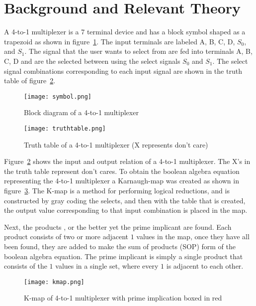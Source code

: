 \documentclass[conference]{IEEEtran}
\begin{document}
\section{Background and Relevant Theory}
\label{sec:Background}

A 4-to-1 multiplexer is a 7 terminal device and has a block symbol shaped as a trapezoid as shown in figure~\ref{fig:blockdiagram}. The input terminals are labeled A, B, C, D, $S_0$, and $S_1$. The signal that the user wants to select from are fed into terminals A, B, C, D and are the selected between using the select signals $S_0$ and $S_1$. The select signal combinations corresponding to each input signal are shown in the truth table of figure~\ref{fig:truthtable}.
       \begin{figure}[H]
       \center
          \texttt{[image: symbol.png]}
          \caption{Block diagram of a 4-to-1 multiplexer}
          \label{fig:blockdiagram}
        \end{figure}

       \begin{figure}[H]
       \center
          \texttt{[image: truthtable.png]}
          \caption{Truth table of a 4-to-1 multiplexer (X represents don't care)}
          \label{fig:truthtable}
        \end{figure}

Figure~\ref{fig:truthtable} shows the input and output relation of a 4-to-1 multiplexer. The X's in the truth table represent don't cares. To obtain the boolean algebra equation representing the 4-to-1 multiplexer a Karnaugh-map was created as shown in figure~\ref{fig:KMap}. The K-map is a method for performing logical reductions, and is constructed by gray coding the selects, and then with the table that is created, the output value corresponding to that input combination is placed in the map. 

Next, the products , or the better yet the prime implicant are found. Each product consists of two or more adjacent $1$ values in the map, once they have all been found, they are added to make the sum of products (SOP) form of the boolean algebra equation. The prime implicant is simply a single product that consists of the $1$ values in a single set, where every $1$ is adjacent to each other. 
       \begin{figure}[H]
       \center
          \texttt{[image: kmap.png]}
          \caption{K-map of 4-to-1 multiplexer with prime implication boxed in red}
          \label{fig:KMap}
        \end{figure}
\end{document}
